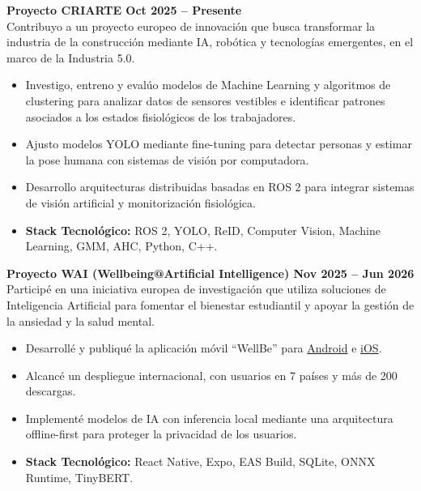 \documentclass[10pt,a4paper]{article}
\begin{document}
\vspace{4pt}
\textbf{\color{accent}Proyecto CRIARTE \textbar{} Oct 2025 -- Presente}\\
Contribuyo a un proyecto europeo de innovación que busca transformar la industria de la construcción mediante IA, robótica y tecnologías emergentes, en el marco de la Industria 5.0.
\begin{itemize}
    \item Investigo, entreno y evalúo modelos de Machine Learning y algoritmos de clustering para analizar datos de sensores vestibles e identificar patrones asociados a los estados fisiológicos de los trabajadores.
    \item Ajusto modelos YOLO mediante fine-tuning para detectar personas y estimar la pose humana con sistemas de visión por computadora.
    \item Desarrollo arquitecturas distribuidas basadas en ROS 2 para integrar sistemas de visión artificial y monitorización fisiológica.
    \item \textbf{Stack Tecnológico:} ROS 2, YOLO, ReID, Computer Vision, Machine Learning, GMM, AHC, Python, C++.
\end{itemize}

\vspace{2pt}
\textbf{\color{accent}Proyecto WAI (Wellbeing@Artificial Intelligence) \textbar{} Nov 2025 -- Jun 2026}\\
Participé en una iniciativa europea de investigación que utiliza soluciones de Inteligencia Artificial para fomentar el bienestar estudiantil y apoyar la gestión de la ansiedad y la salud mental.
\begin{itemize}
    \item Desarrollé y publiqué la aplicación móvil ``WellBe'' para \href{https://play.google.com/store/apps/details?id=com.caloale.waiv1\&hl=en_US}{Android} e \href{https://apps.apple.com/ie/app/wellbe-journaling-app/id6758772082}{iOS}.
    \item Alcancé un despliegue internacional, con usuarios en 7 países y más de 200 descargas.
    \item Implementé modelos de IA con inferencia local mediante una arquitectura offline-first para proteger la privacidad de los usuarios.
    \item \textbf{Stack Tecnológico:} React Native, Expo, EAS Build, SQLite, ONNX Runtime, TinyBERT.
\end{itemize}
\end{document}
